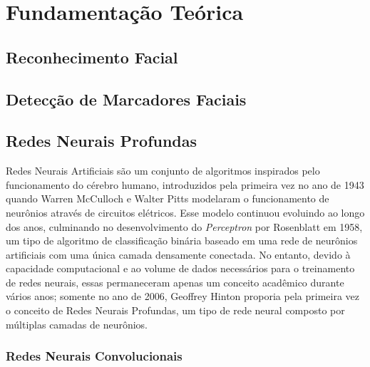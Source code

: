\chapter{Fundamentação Teórica}

\section{Reconhecimento Facial}
\label{sec:facialrecog}

\section{Detecção de Marcadores Faciais}
\label{sec:faciallm}

\section{Redes Neurais Profundas}
\label{sec:dnn}

Redes Neurais Artificiais são um conjunto de algoritmos inspirados pelo funcionamento do cérebro humano, introduzidos pela primeira vez no ano de 1943 quando Warren McCulloch e Walter Pitts modelaram o funcionamento de neurônios através de circuitos elétricos\cite{mccullochLogicalCalculusIdeas1943}. Esse modelo continuou evoluindo ao longo dos anos, culminando no desenvolvimento do \textit{Perceptron} por Rosenblatt em 1958\cite{rosenblattPerceptronProbabilisticModel1958}, um tipo de algoritmo de classificação binária baseado em uma rede de neurônios artificiais com uma única camada densamente conectada. No entanto, devido à capacidade computacional e ao volume de dados necessários para o treinamento de redes neurais, essas permaneceram apenas um conceito acadêmico durante vários anos; somente no ano de 2006, Geoffrey Hinton proporia pela primeira vez o conceito de Redes Neurais Profundas\cite{hintonFastLearningAlgorithm2006}, um tipo de rede neural composto por múltiplas camadas de neurônios.




\subsection{Redes Neurais Convolucionais}
\label{sec:convnet}